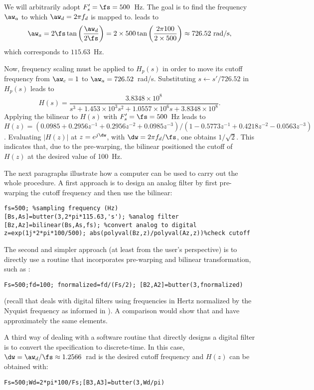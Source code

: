 
We will arbitrarily adopt $F'_s = \fs = 500$~Hz.
The goal is to find the frequency $\aw_a$ to which $\aw_d = 2  \pi f_d$ is mapped to.
 leads to
\[
\aw_a = 2 \fs \tan \left( \frac{\aw_d}{2 \fs} \right) = 2 \times 500  \tan \left( \frac{2 \pi 100}{2 \times 500} \right) \approx 726.52~\textrm{rad/s},
\]
which corresponds to $115.63$~Hz.

Now, frequency scaling must be applied to $H_p(s)$ in order to move its cutoff frequency from $\aw_c=1$ to $\aw_a=726.52$~rad/s. Substituting $s \leftarrow s'/ 726.52$  in $H_p(s)$ leads to
\[
H(s) = \frac{3.8348 \times 10^8}{s^3+ 1.453 \times 10^3 s^2+ 1.0557 \times 10^6 s+ 3.8348 \times 10^8}.
\]
Applying the bilinear to $H(s)$ with $F'_s = \fs = 500$~Hz leads to
$H(z) = (0.0985 + 0.2956 z^{-1} +  0.2956z^{-2} + 0.0985 z^{-3})/(1   -0.5773 z^{-1} +    0.4218 z^{-2} -0.0563 z^{-3})$. Evaluating $|H(z)|$ at $z=e^{j\dw}$, with $\dw = 2 \pi f_d / \fs$, one obtains $1/\sqrt{2}$. This indicates that, due to the pre-warping, the bilinear positioned the cutoff of $H(z)$ at the desired value of 100~Hz.

The next paragraphs illustrate how a computer can be used to carry out the whole procedure.
A first approach is to design an analog filter by first pre-warping the cutoff frequency and then use the bilinear:
\begin{lstlisting}
fs=500; %sampling frequency (Hz)
[Bs,As]=butter(3,2*pi*115.63,'s'); %analog filter
[Bz,Az]=bilinear(Bs,As,fs); %convert analog to digital
z=exp(1j*2*pi*100/500); abs(polyval(Bz,z)/polyval(Az,z))%check cutoff
\end{lstlisting}
The second and simpler approach (at least from the user's perspective) is to directly use a routine that incorporates pre-warping and bilinear transformation, such as :
\begin{lstlisting}
Fs=500;fd=100; fnormalized=fd/(Fs/2); [B2,A2]=butter(3,fnormalized)
\end{lstlisting}
(recall that {\matlab} deals with digital filters using frequencies in Hertz normalized by the Nyquist frequency as informed in ). 
A comparison would show that \ci{[Bz,Az]} and \ci{[B2,A2]} have approximately the same elements.

A third way of dealing with a software routine that directly designs a digital filter is
to convert the specification to discrete-time. In this case, $\dw = \aw_d / \fs \approx 1.2566$~rad
is the desired cutoff frequency and $H(z)$ can be obtained with:
\begin{lstlisting}
Fs=500;Wd=2*pi*100/Fs;[B3,A3]=butter(3,Wd/pi)
\end{lstlisting}

